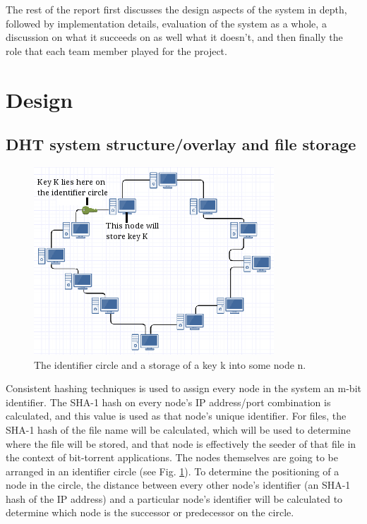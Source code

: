 \documentclass[fleqn,24pt]{SelfArx} %
\begin{document}
The rest of the report first discusses the design aspects of the system in depth, followed by implementation details, evaluation of the system as a whole, a discussion on what it succeeds on as well what it doesn't, and then finally the role that each team member played for the project.

\section{Design}

\subsection{DHT system structure/overlay and file storage}

\begin{figure}
\includegraphics{Selection_152.png}
\caption{\label{family}The identifier circle and a storage of a key k into some node n.}
\label{1}
\end{figure}

Consistent hashing techniques is used to assign every node in the system an m-bit identifier. The SHA-1 hash on every node’s IP address/port combination is calculated, and this value is used as that node's unique identifier. For files, the SHA-1 hash of the file name will be calculated, which will be used to determine where the file will be stored, and that node is effectively the seeder of that file in the context of bit-torrent applications. The nodes themselves are going to be arranged in an identifier circle (see Fig. \ref{1}). To determine the positioning of a node in the circle, the distance between every other node's identifier (an SHA-1 hash of the IP address) and a particular node's identifier will be calculated to determine which node is the successor or predecessor on the circle.   
\end{document}
